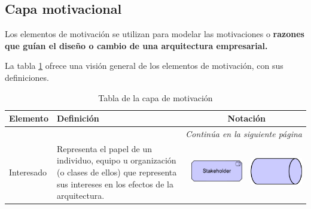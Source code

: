

\subsection{Capa motivacional}

Los elementos de motivación se utilizan para modelar las motivaciones o \textbf{razones que guían el diseño o cambio de una arquitectura empresarial.}

La tabla \ref{tab:Tabla de la capa de motivación} ofrece una visión general de los elementos de motivación, con sus definiciones. \cite{archimate}

\begin{longtable}{|p{0.15\linewidth}|p{0.45\linewidth}|p{0.2\linewidth} p{0.2\linewidth}|}
    \caption{Tabla de la capa de motivación}
    \\
    \hline
    \rowcolor[HTML]{DAE8FC} 
    \textbf{Elemento} & \textbf{Definición} & \multicolumn{2}{c|}{\textbf{Notación}} \\
    \hline
    \endhead
    \hline
    \multicolumn{4}{r}{\textit{Continúa en la siguiente página}} \\
    \endfoot
    \hline
    \endlastfoot
    \label{tab:Tabla de la capa de motivación}

    Interesado &
    Representa el papel de un individuo, equipo u organización (o clases de ellos) que representa sus intereses en los efectos de la arquitectura. &
\begin{center}
    \includegraphics[width=1\linewidth]{imgs/capa_motivacional/stakeholder1.pdf}
\end{center} &
\begin{center}
    \includegraphics[width=0.7\linewidth]{imgs/capa_motivacional/stakeholder2.pdf}
\end{center}
    \\ \hline


\end{longtable}
